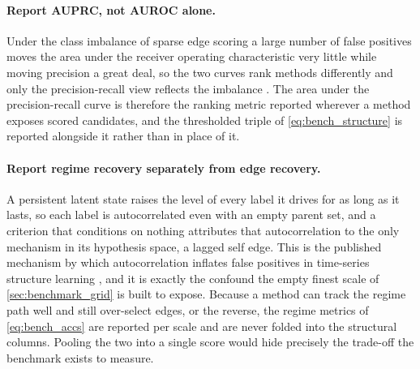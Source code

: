 \paragraph{Report AUPRC, not AUROC alone.}
Under the class imbalance of sparse edge scoring a large number of false
positives moves the area under the receiver operating characteristic very
little while moving precision a great deal, so the two curves rank methods
differently and only the precision-recall view reflects the imbalance
\citep{davis2006prroc}. The area under the precision-recall curve is therefore
the ranking metric reported wherever a method exposes scored candidates, and
the thresholded triple of \eqref{eq:bench_structure} is reported alongside it
rather than in place of it.

\paragraph{Report regime recovery separately from edge recovery.}
A persistent latent state raises the level of every label it drives for as long
as it lasts, so each label is autocorrelated even with an empty parent set, and
a criterion that conditions on nothing attributes that autocorrelation to the
only mechanism in its hypothesis space, a lagged self edge. This is the
published mechanism by which autocorrelation inflates false positives in
time-series structure learning \citep{runge2018pitfalls}, and it is exactly the
confound the empty finest scale of \cref{sec:benchmark_grid} is built to expose.
Because a method can track the regime path well and still over-select edges, or
the reverse, the regime metrics of \eqref{eq:bench_accs} are reported per scale
and are never folded into the structural columns. Pooling the two into a single
score would hide precisely the trade-off the benchmark exists to measure.
